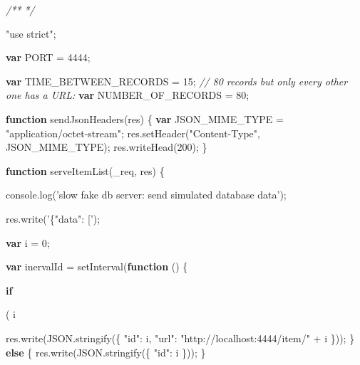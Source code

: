 \documentclass[12pt, ]{article}
\newenvironment{Shaded}{}{}
\newcommand{\KeywordTok}[1]{\textcolor[rgb]{0.00,0.44,0.13}{\textbf{{#1}}}}
\newcommand{\DecValTok}[1]{\textcolor[rgb]{0.25,0.63,0.44}{{#1}}}
\newcommand{\StringTok}[1]{\textcolor[rgb]{0.25,0.44,0.63}{{#1}}}
\newcommand{\CommentTok}[1]{\textcolor[rgb]{0.38,0.63,0.69}{\textit{{#1}}}}
\newcommand{\OtherTok}[1]{\textcolor[rgb]{0.00,0.44,0.13}{{#1}}}
\newcommand{\FunctionTok}[1]{\textcolor[rgb]{0.02,0.16,0.49}{{#1}}}
\newcommand{\NormalTok}[1]{{#1}}
\begin{document}
\begin{Shaded}
\begin{Highlighting}[]
\CommentTok{/**   }
\CommentTok{ */}

\StringTok{"use strict"}\NormalTok{;}

\KeywordTok{var} \NormalTok{PORT = }\DecValTok{4444}\NormalTok{;}

\KeywordTok{var} \NormalTok{TIME_BETWEEN_RECORDS = }\DecValTok{15}\NormalTok{;}
\CommentTok{// 80 records but only every other one has a URL:}
\KeywordTok{var} \NormalTok{NUMBER_OF_RECORDS = }\DecValTok{80}\NormalTok{;}

\KeywordTok{function} \FunctionTok{sendJsonHeaders}\NormalTok{(res) \{}
   \KeywordTok{var} \NormalTok{JSON_MIME_TYPE = }\StringTok{"application/octet-stream"}\NormalTok{;}
   \OtherTok{res}\NormalTok{.}\FunctionTok{setHeader}\NormalTok{(}\StringTok{"Content-Type"}\NormalTok{, JSON_MIME_TYPE);}
   \OtherTok{res}\NormalTok{.}\FunctionTok{writeHead}\NormalTok{(}\DecValTok{200}\NormalTok{);}
\NormalTok{\}}

\KeywordTok{function} \FunctionTok{serveItemList}\NormalTok{(_req, res) \{}

   \OtherTok{console}\NormalTok{.}\FunctionTok{log}\NormalTok{(}\StringTok{'slow fake db server: send simulated database data'}\NormalTok{);}

   \OtherTok{res}\NormalTok{.}\FunctionTok{write}\NormalTok{(}\StringTok{'\{"data": ['}\NormalTok{);}

   \KeywordTok{var} \NormalTok{i = }\DecValTok{0}\NormalTok{;}

   \KeywordTok{var} \NormalTok{inervalId = }\FunctionTok{setInterval}\NormalTok{(}\KeywordTok{function} \NormalTok{() \{}

      \KeywordTok{if}\NormalTok{( i %

         \OtherTok{res}\NormalTok{.}\FunctionTok{write}\NormalTok{(}\OtherTok{JSON}\NormalTok{.}\FunctionTok{stringify}\NormalTok{(\{}
            \StringTok{"id"}\NormalTok{: i,}
            \StringTok{"url"}\NormalTok{: }\StringTok{"http://localhost:4444/item/"} \NormalTok{+ i         }
         \NormalTok{\}));}
      \NormalTok{\} }\KeywordTok{else} \NormalTok{\{}
         \OtherTok{res}\NormalTok{.}\FunctionTok{write}\NormalTok{(}\OtherTok{JSON}\NormalTok{.}\FunctionTok{stringify}\NormalTok{(\{}
            \StringTok{"id"}\NormalTok{: i         }
         \NormalTok{\}));      }
      \NormalTok{\}}
      
}
\end{Highlighting}
\end{Shaded}
\end{document}
